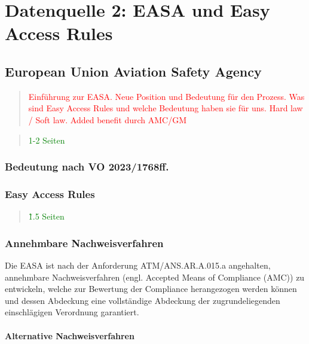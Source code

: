 \chapter{Datenquelle 2: EASA und Easy Access Rules}

    \section{European Union Aviation Safety Agency}

\begin{quote}
\textcolor{red}{Einführung zur EASA. Neue Position und Bedeutung für den Prozess. Was sind Easy Access Rules und welche Bedeutung haben sie für uns. Hard law / Soft law. Added benefit durch AMC/GM}
\end{quote}
\begin{quote}
\textcolor{green}{1-2 Seiten}
\end{quote}
        
        \subsection{Bedeutung nach VO 2023/1768ff.}
        
        \pagebreak
        \subsection{Easy Access Rules}

\begin{quote}
\textcolor{green}{\~1.5 Seiten}
\end{quote}

        \pagebreak
        \subsection{Annehmbare Nachweisverfahren}

        Die \ac{EASA} ist nach der Anforderung \textsf{ATM/ANS.AR.A.015.a} angehalten, annehmbare Nachweisverfahren (engl. Accepted Means of Compliance (AMC)) zu entwickeln, welche zur Bewertung der Compliance herangezogen werden können und dessen Abdeckung eine vollständige Abdeckung der zugrundeliegenden einschlägigen Verordnung garantiert. 
        \cite[Anh. II]{2017R0373}


    \subsubsection{Alternative Nachweisverfahren}
        

